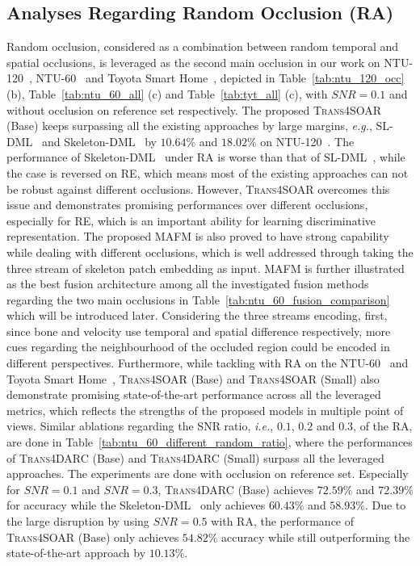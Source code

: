 \documentclass[lettersize,journal]{IEEEtran}
\begin{document}
\subsection{Analyses Regarding Random Occlusion (RA)}
Random occlusion, considered as a combination between random temporal and spatial occlusions, is leveraged as the second main occlusion in our work on NTU-120~\cite{liu2019ntu}, NTU-60~\cite{shahroudy2016ntu} and Toyota Smart Home~\cite{Das_2019_ICCV}, depicted in Table~\ref{tab:ntu_120_occ} (b), Table~\ref{tab:ntu_60_all} (c) and Table~\ref{tab:tyt_all} (c), with $SNR=0.1$ and without occlusion on reference set respectively.
The proposed \textsc{Trans4SOAR} (Base) keeps surpassing all the existing approaches by large margins, \textit{e.g.}, SL-DML~\cite{memmesheimer2021sl} and Skeleton-DML~\cite{memmesheimer2020skeleton_dml} by $10.64\%$ and $18.02\%$ on NTU-120~\cite{liu2019ntu}.
The performance of Skeleton-DML~\cite{memmesheimer2020skeleton_dml} under RA is worse than that of SL-DML~\cite{memmesheimer2021sl}, while the case is reversed on RE, which means most of the existing approaches can not be robust against different occlusions.
However, \textsc{Trans4SOAR} overcomes this issue and demonstrates promising performances over different occlusions, especially for RE, which is an important ability for learning discriminative representation.
The proposed MAFM is also proved to have strong capability while dealing with different occlusions, which is well addressed through taking the three stream of skeleton patch embedding as input.
MAFM is further illustrated as the best fusion architecture among all the investigated fusion methods regarding the two main occlusions in Table~\ref{tab:ntu_60_fusion_comparison} which will be introduced later.
Considering the three streams encoding, first, since bone and velocity use temporal and spatial difference respectively, more cues regarding the neighbourhood of the occluded region could be encoded in different perspectives.
Furthermore, while tackling with RA on the NTU-60~\cite{shahroudy2016ntu} and Toyota Smart Home~\cite{Das_2019_ICCV}, \textsc{Trans4SOAR} (Base) and \textsc{Trans4SOAR} (Small) also demonstrate promising state-of-the-art performance across all the leveraged metrics, which reflects the strengths of the proposed models in multiple point of views. Similar ablations regarding the SNR ratio, \textit{i.e.}, $0.1$, $0.2$ and $0.3$, of the RA, are done in Table~\ref{tab:ntu_60_different_random_ratio}, where the performances of \textsc{Trans4DARC} (Base) and \textsc{Trans4DARC} (Small) surpass all the leveraged approaches. The experiments are done with occlusion on reference set. Especially for $SNR=0.1$ and $SNR=0.3$, \textsc{Trans4DARC} (Base) achieves $72.59\%$ and $72.39\%$ for accuracy while the Skeleton-DML~\cite{memmesheimer2020skeleton_dml} only achieves $60.43\%$ and $58.93\%$. Due to the large disruption by using $SNR=0.5$ with RA, the performance of \textsc{Trans4SOAR} (Base) only achieves $54.82\%$ accuracy while still outperforming the state-of-the-art approach by $10.13\%$.
\end{document}
